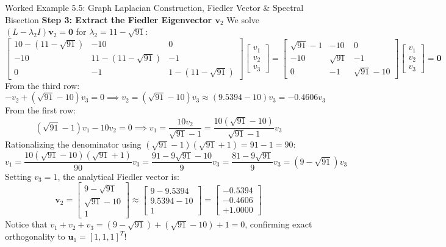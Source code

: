 \begin{examplebox}{Worked Example 5.5: Graph Laplacian Construction, Fiedler Vector \& Spectral Bisection}
\textbf{Step 3: Extract the Fiedler Eigenvector $\mathbf{v}_2$}
We solve $(L - \lambda_2 I)\mathbf{v}_2 = \mathbf{0}$ for $\lambda_2 = 11 - \sqrt{91}$:
\begin{equation*}
\begin{bmatrix} 10 - (11 - \sqrt{91}) & -10 & 0 \\ -10 & 11 - (11 - \sqrt{91}) & -1 \\ 0 & -1 & 1 - (11 - \sqrt{91}) \end{bmatrix} \begin{bmatrix} v_1 \\ v_2 \\ v_3 \end{bmatrix} = \begin{bmatrix} \sqrt{91} - 1 & -10 & 0 \\ -10 & \sqrt{91} & -1 \\ 0 & -1 & \sqrt{91} - 10 \end{bmatrix} \begin{bmatrix} v_1 \\ v_2 \\ v_3 \end{bmatrix} = \mathbf{0}
\end{equation*}
From the third row:
\begin{equation*}
-v_2 + (\sqrt{91} - 10)v_3 = 0 \implies v_2 = (\sqrt{91} - 10)v_3 \approx (9.5394 - 10)v_3 = -0.4606 v_3
\end{equation*}
From the first row:
\begin{equation*}
(\sqrt{91} - 1)v_1 - 10 v_2 = 0 \implies v_1 = \frac{10 v_2}{\sqrt{91} - 1} = \frac{10(\sqrt{91} - 10)}{\sqrt{91} - 1} v_3
\end{equation*}
Rationalizing the denominator using $(\sqrt{91} - 1)(\sqrt{91} + 1) = 91 - 1 = 90$:
\begin{equation*}
v_1 = \frac{10(\sqrt{91} - 10)(\sqrt{91} + 1)}{90} v_3 = \frac{91 - 9\sqrt{91} - 10}{9} v_3 = \frac{81 - 9\sqrt{91}}{9} v_3 = (9 - \sqrt{91})v_3
\end{equation*}
Setting $v_3 = 1$, the analytical Fiedler vector is:
\begin{equation*}
\mathbf{v}_2 = \begin{bmatrix} 9 - \sqrt{91} \\ \sqrt{91} - 10 \\ 1 \end{bmatrix} \approx \begin{bmatrix} 9 - 9.5394 \\ 9.5394 - 10 \\ 1 \end{bmatrix} = \begin{bmatrix} -0.5394 \\ -0.4606 \\ +1.0000 \end{bmatrix}
\end{equation*}
Notice that $v_1 + v_2 + v_3 = (9 - \sqrt{91}) + (\sqrt{91} - 10) + 1 = 0$, confirming exact orthogonality to $\mathbf{u}_1 = [1, 1, 1]^T$!


\end{examplebox}
